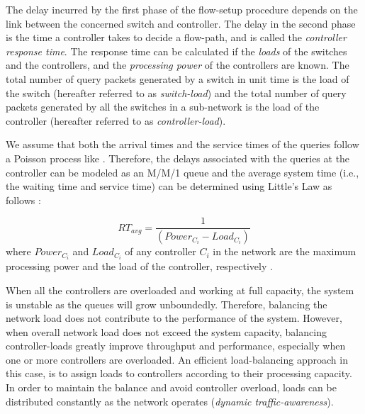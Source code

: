 \documentclass[a4paper,fleqn]{cas-dc}
\begin{document}
The delay incurred by the first phase of the flow-setup procedure depends on the link between the concerned switch and controller. The delay in the second phase is the time a controller takes to decide a flow-path, and is called the \textit{controller response time}. The response time can be calculated if the \textit{loads} of the switches and the controllers, and the \textit{processing power} of the controllers are known. The total number of query packets generated by a switch in unit time is the load of the switch (hereafter referred to as \textit{switch-load}) and the total number of query packets generated by all the switches in a sub-network is the load of the controller (hereafter referred to as \textit{controller-load}).

We assume that both the arrival times and the service times of the queries follow a Poisson process like \cite{wang2016load}. Therefore, the delays associated with the queries at the controller can be modeled as an M/M/1 queue and the average system time (i.e., the waiting time and service time) can be determined using Little's Law as follows \cite{wang2016load}:

\begin{equation} \label{eqn:cresponse}
RT_{avg} = \frac{1}{(Power_{C_i} - Load_{C_i})}
\end{equation}
where $Power_{C_i}$ and $Load_{C_i}$ of any controller $C_i$ in the network are the maximum processing power and the load of the controller, respectively .

When all the controllers are overloaded and working at full capacity, the system is unstable as the queues will grow unboundedly. Therefore, balancing the network load does not contribute to the performance of the system. However, when overall network load does not exceed the system capacity, balancing controller-loads greatly improve throughput and performance, especially when one or more controllers are overloaded. An efficient load-balancing approach in this case, is to assign loads to controllers according to their processing capacity. In order to maintain the balance and avoid controller overload, loads can be distributed constantly as the network operates (\textit{dynamic traffic-awareness}).
\end{document}
